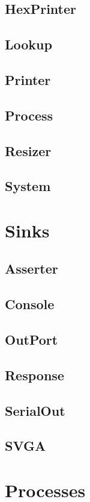 \subsection{HexPrinter}
\subsection{Lookup}
\subsection{Printer}
\subsection{Process}
\subsection{Resizer}
\subsection{System}

\section{Sinks}
\subsection{Asserter}
\subsection{Console}
\subsection{OutPort}
\subsection{Response}
\subsection{SerialOut}
\subsection{SVGA}

\section{Processes}
